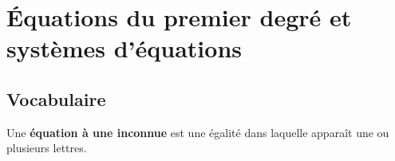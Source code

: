 \documentclass[main.tex]{subfiles}
\begin{document}
 
\cleardoublepage 
{}  
\pagestyle{scrheadings} %
\onehalfspacing 
\setcounter{chapter}{2}

%	 
\chapter{Équations du premier degré et systèmes d'équations}




\section{Vocabulaire}
Une \textbf{équation à une inconnue} est une égalité dans laquelle apparaît une ou plusieurs lettres.
\end{document}
